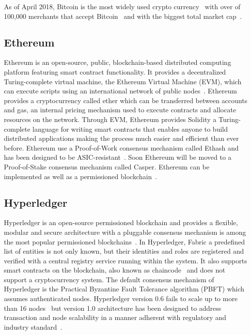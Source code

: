 As of April 2018, Bitcoin is the most widely used crypto currency~\cite{10.1007/978-3-642-39884-1_2} with over of 100,000 merchants that accept Bitcoin~\cite{wiki:bitcoin} and with the biggest total market cap~\cite{btc_cap}.

\subsection{Ethereum}\label{blockchain:impl:ethereum}

Ethereum is an open-source, public, blockchain-based distributed computing platform featuring smart contract functionality.
It provides a decentralized Turing-complete virtual machine, the Ethereum Virtual Machine (EVM), which can execute scripts using an
international network of public nodes~\cite{wiki:ethereum}. Ethereum provides a cryptocurrency called ether which can be transferred between accounts and gas,
an internal pricing mechanism used to execute contracts and allocate resources on the network. Through EVM, Ethereum provides Solidity a
Turing-complete language for writing smart contracts that enables anyone to build distributed applications making the process much easier and efficient than ever before.
Ethereum use a Proof-of-Work consensus mechanism called Ethash and has been designed to be ASIC-resistant~\cite{ethash}.
Soon Ethereum will be moved to a Proof-of-Stake consensus mechanism called Casper. Ethereum can be implemented as well as a permissioned blockchain~\cite{consortium_chain_development,quorum}.


\subsection{Hyperledger}\label{blockchain:impl:hyperledger}

Hyperledger is an open-source permissioned blockchain and provides a flexible, modular and secure architecture with a
pluggable consensus mechanism is among the most popular permissioned blockchains~\cite{DBLP:journals/corr/abs-1708-05665}. In Hyperledger, Fabric a predefined list of
entities is not only known, but their identities and roles are registered and verified with a central registry service running within the system.
It also supports smart contracts on the blockchain, also known as chaincode~\cite{bl_consensus} and does not support a cryptocurrency system. The default consensus
mechanism of Hyperledger is the Practical Byzantine Fault Tolerance algorithm (PBFT) which assumes authenticated nodes.
Hyperledger version 0.6 fails to scale up to more than 16 nodes~\cite{DBLP:journals/corr/abs-1708-05665} but version 1.0 architecture has been designed to address transaction and
node scalability in a manner adherent with regulatory and industry standard~\cite{imb_hypeledger_adv}.

